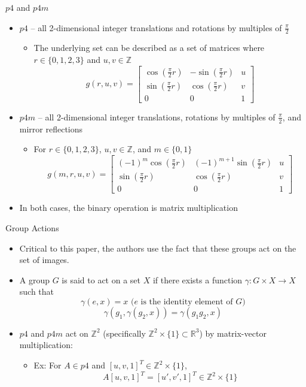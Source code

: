 \documentclass{beamer}
\newcommand{\R}{\mathbb{R}}
\newcommand{\Z}{\mathbb{Z}}
\begin{document}
\begin{frame}{$p4$ and $p4m$}
    \begin{itemize}
        \item $p4$ -- all 2-dimensional integer translations and rotations by multiples of $\frac{\pi}{2}$
        \begin{itemize}
            \item The underlying set can be described as a set of matrices where $r \in \{0, 1, 2, 3\}$ and $u, v \in \mathbb{Z}$
            $$g(r, u, v) = \begin{bmatrix}
                \cos(\frac{\pi}{2}r) & -\sin(\frac{\pi}{2}r) & u \\
                \sin(\frac{\pi}{2}r) & \cos(\frac{\pi}{2}r) & v \\
                0 & 0 & 1
            \end{bmatrix}$$
        \end{itemize}
        \item $p4m$ -- all 2-dimensional integer translations, rotations by multiples of $\frac{\pi}{2}$, and mirror reflections
        \begin{itemize}
            \item For $r \in \{0, 1, 2, 3\}$, $u, v \in \mathbb{Z}$, and $m \in \{0, 1\}$
            $$g(m, r, u, v) = \begin{bmatrix}
                (-1)^m\cos(\frac{\pi}{2}r) & (-1)^{m+1}\sin(\frac{\pi}{2}r) & u \\
                \sin(\frac{\pi}{2}r) & \cos(\frac{\pi}{2}r) & v \\
                0 & 0 & 1
            \end{bmatrix}$$
        \end{itemize}
        \item In both cases, the binary operation is matrix multiplication
    \end{itemize}
\end{frame}

\begin{frame}{Group Actions}
    \begin{itemize}
        \item Critical to this paper, the authors use the fact that these groups act on the set of images.
        \item A group $G$ is said to act on a set $X$ if there exists a function $\gamma: G\times X \to X$ such that 
        $$\gamma(e, x) = x \text{ ($e$ is the identity element of $G$)}$$
        $$\gamma(g_1, \gamma(g_2, x)) = \gamma(g_1g_2, x)$$
        \item $p4$ and $p4m$ act on $\Z^2$ (specifically $\Z^2 \times \{1\} \subset \R^3$) by matrix-vector multiplication:
        \begin{itemize}
            \item Ex: For $A\in p4$ and $[u, v, 1]^T \in \Z^2 \times \{1\}$, $$A[u, v, 1]^T = [u', v', 1]^T \in \Z^2 \times \{1\}$$
        \end{itemize} 
    \end{itemize}
\end{frame}
\end{document}
